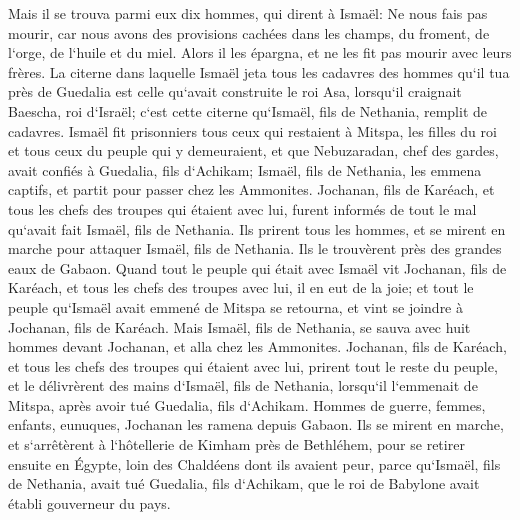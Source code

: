 \verse Mais il se trouva parmi eux dix hommes, qui dirent à Ismaël: Ne nous fais pas mourir, car nous avons des provisions cachées dans les champs, du froment, de l`orge, de l`huile et du miel. Alors il les épargna, et ne les fit pas mourir avec leurs frères. 
\verse La citerne dans laquelle Ismaël jeta tous les cadavres des hommes qu`il tua près de Guedalia est celle qu`avait construite le roi Asa, lorsqu`il craignait Baescha, roi d`Israël; c`est cette citerne qu`Ismaël, fils de Nethania, remplit de cadavres. 
\verse Ismaël fit prisonniers tous ceux qui restaient à Mitspa, les filles du roi et tous ceux du peuple qui y demeuraient, et que Nebuzaradan, chef des gardes, avait confiés à Guedalia, fils d`Achikam; Ismaël, fils de Nethania, les emmena captifs, et partit pour passer chez les Ammonites. 
\verse Jochanan, fils de Karéach, et tous les chefs des troupes qui étaient avec lui, furent informés de tout le mal qu`avait fait Ismaël, fils de Nethania. 
\verse Ils prirent tous les hommes, et se mirent en marche pour attaquer Ismaël, fils de Nethania. Ils le trouvèrent près des grandes eaux de Gabaon. 
\verse Quand tout le peuple qui était avec Ismaël vit Jochanan, fils de Karéach, et tous les chefs des troupes avec lui, il en eut de la joie; 
\verse et tout le peuple qu`Ismaël avait emmené de Mitspa se retourna, et vint se joindre à Jochanan, fils de Karéach. 
\verse Mais Ismaël, fils de Nethania, se sauva avec huit hommes devant Jochanan, et alla chez les Ammonites. 
\verse Jochanan, fils de Karéach, et tous les chefs des troupes qui étaient avec lui, prirent tout le reste du peuple, et le délivrèrent des mains d`Ismaël, fils de Nethania, lorsqu`il l`emmenait de Mitspa, après avoir tué Guedalia, fils d`Achikam. Hommes de guerre, femmes, enfants, eunuques, Jochanan les ramena depuis Gabaon. 
\verse Ils se mirent en marche, et s`arrêtèrent à l`hôtellerie de Kimham près de Bethléhem, pour se retirer ensuite en Égypte, 
\verse loin des Chaldéens dont ils avaient peur, parce qu`Ismaël, fils de Nethania, avait tué Guedalia, fils d`Achikam, que le roi de Babylone avait établi gouverneur du pays. 

